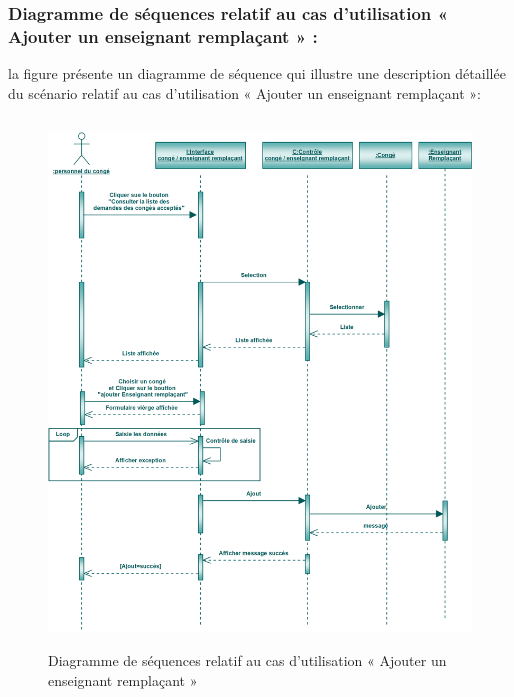 \documentclass[12 pt ]{report}
\begin{document}
\subsubsection{Diagramme de séquences relatif au cas d’utilisation « Ajouter un enseignant remplaçant » :}
la figure   présente un diagramme de séquence qui illustre une description détaillée du scénario relatif au cas d’utilisation « Ajouter un enseignant remplaçant »: 
\begin{figure}[h]
 \begin{center}
\includegraphics[width= 15 cm ,height=  14cm]{sec_ajo_rem.PNG}
\caption{Diagramme de séquences relatif au cas d’utilisation « Ajouter un enseignant remplaçant »}

\end{center}
\end{figure}
\newpage
\end{document}
